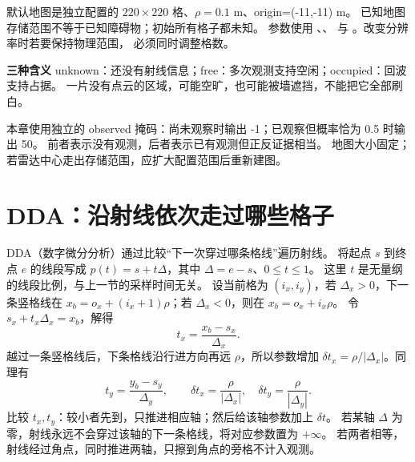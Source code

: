 \begin{center}
\end{center}

默认地图是独立配置的 $220\times220$ 格、$\rho=0.1$ m、origin=(-11,-11) m。
已知地图存储范围不等于已知障碍物；初始所有格子都未知。
参数使用 、、
 与 。改变分辨率时若要保持物理范围，
必须同时调整格数。

\begin{notebox}
\textbf{三种含义}\quad
unknown：还没有射线信息；free：多次观测支持空闲；occupied：回波支持占据。
一片没有点云的区域，可能空旷，也可能被墙遮挡，不能把它全部刷白。
\end{notebox}
本章使用独立的 observed 掩码：尚未观察时输出 -1；已观察但概率恰为 0.5 时输出 50。
前者表示没有观测，后者表示已有观测但正反证据相当。
地图大小固定；若雷达中心走出存储范围，应扩大配置范围后重新建图。

\section{DDA：沿射线依次走过哪些格子}
DDA（数字微分分析）通过比较“下一次穿过哪条格线”遍历射线。
将起点 $s$ 到终点 $e$ 的线段写成 $p(t)=s+t\Delta$，其中 $\Delta=e-s$、$0\le t\le1$。
这里 $t$ 是无量纲的线段比例，与上一节的采样时间无关。
设当前格为 $(i_x,i_y)$，若 $\Delta_x>0$，下一条竖格线在
$x_b=o_x+(i_x+1)\rho$；若 $\Delta_x<0$，则在 $x_b=o_x+i_x\rho$。
令 $s_x+t_x\Delta_x=x_b$，解得
\begin{equation}
t_x=\frac{x_b-s_x}{\Delta_x}.
\end{equation}
越过一条竖格线后，下条格线沿行进方向再远 $\rho$，所以参数增加
$\delta t_x=\rho/|\Delta_x|$。同理有
\begin{equation}
t_y=\frac{y_b-s_y}{\Delta_y},\qquad
\delta t_x=\frac{\rho}{|\Delta_x|},\quad
\delta t_y=\frac{\rho}{|\Delta_y|}.
\end{equation}
比较 $t_x,t_y$：较小者先到，只推进相应轴；然后给该轴参数加上 $\delta t$。
若某轴 $\Delta$ 为零，射线永远不会穿过该轴的下一条格线，将对应参数置为 $+\infty$。
若两者相等，射线经过角点，同时推进两轴，只擦到角点的旁格不计入观测。

